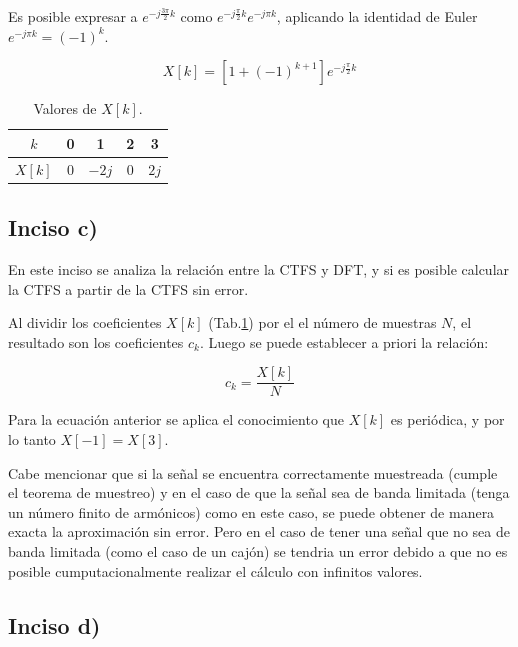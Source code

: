 \documentclass{article}
\begin{document}
    Es posible expresar a $e^{-j\frac{ 3 \pi}{2}k}$ como $e^{-j \frac{\pi }{2}k}e^{-j\pi k}$, aplicando la identidad de Euler 
    $e^{-j \pi k}= (-1)^k$. 

    \begin{equation}
        X[k]= [ 1 + (-1)^{k+1} ] e^{ -j \frac{\pi }{2} k }
    \end{equation}

    \begin{table}[H]
        \centering
        \begin{tabular}{|c|c|c|c|c|}
            \hline
            $k$ & 0 & 1 & 2 & 3  \\ \hline
            $X[k]$ & 0 & $-2j$ & 0 & $2j$ \\ \hline
            \end{tabular}
        \caption{Valores de $X[k]$.}
        \label{tab.xk}
    \end{table}

    \subsection*{Inciso c)}

    En este inciso se analiza la relación entre la CTFS y DFT, y si es posible calcular la CTFS a partir de la CTFS sin error.

    Al dividir los coeficientes $X[k]$ (Tab.\ref{tab.xk}) por el el número de muestras $N$, el resultado son los coeficientes 
    $c_k$. Luego se puede establecer a priori la relación:
    
    \begin{equation}
        c_k = \frac{X[k]}{N}
    \end{equation}

    Para la ecuación anterior se aplica el conocimiento que $X[k]$ es periódica, y por lo tanto $X[-1]=X[3]$.

    Cabe mencionar que si la señal se encuentra correctamente muestreada (cumple el teorema de muestreo) y en el caso de que la señal sea de banda limitada (tenga un número finito de 
    armónicos) como en este caso, se puede obtener de manera exacta la aproximación sin error. Pero en el caso de tener una señal que no sea de banda limitada (como el caso de un cajón) se tendria un error debido 
    a que no es posible cumputacionalmente realizar el cálculo con infinitos valores.


    \subsection*{Inciso d)}
\end{document}
